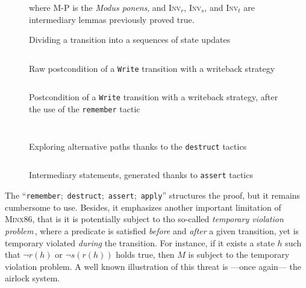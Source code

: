 \documentclass[oneside,a4paper]{memoir}
\theoremstyle{break}
\begin{document}
\begin{figure}
{  \vspace{0.5cm} where {\scshape M-P} is the \emph{Modus ponens}, and {\scshape
    Inv}\( _r \), {\scshape Inv}\( _s \), and {\scshape Inv}\( _t \) are
  intermediary lemmas previously proved true.%
}

\caption{Dividing a transition into a sequences of state updates}
\label{freespec:figure:seqproof}
\end{figure}

\begin{figure}
  \inputminted{coq}{Listings/StateHell.v}

  \caption{Raw postcondition of a \texttt{Write} transition with a writeback
    strategy}
  \label{fig:freespec:entrypoint}
\end{figure}

\begin{figure}
  \inputminted{coq}{Listings/RememberPattern.v}

  \caption{Postcondition of a \texttt{Write} transition with a writeback
    strategy, after the use of the \texttt{remember} tactic}
  \label{fig:freespec:remember}
\end{figure}

\begin{figure}
  \inputminted{coq}{Listings/DestructGoal.v}

  \inputminted{coq}{Listings/DestructGoal2.v}

  \caption{Exploring alternative paths thanks to the \texttt{destruct} tactics}
  \label{fig:freespec:destruct}
\end{figure}

\begin{figure}
  \inputminted{coq}{Listings/InvGoals.v}

  \caption{Intermediary statements, generated thanks to \texttt{assert} tactics}
  \label{fig:freespec:assert}
\end{figure}

The ``\texttt{remember};~\texttt{destruct};~\texttt{assert};~\texttt{apply}''
structures the proof, but it remains cumbersome to use.
%
Besides, it emphasizes another important limitation of {\scshape Minx86}, that
is it is potentially subject to tho so-called \emph{temporary violation
  problem}\,\cite{muller2006tempviolation}, where a predicate is satisfied
\emph{before} and \emph{after} a given transition, yet is temporary violated
\emph{during} the transition.
%
For instance, if it exists a state \( h \) such that \( \neg r(h) \) or
\( \neg s(r(h)) \) holds true, then \( M \) is subject to the temporary
violation problem.
%
A well known illustration of this threat is ---once again--- the airlock system.
\end{document}
